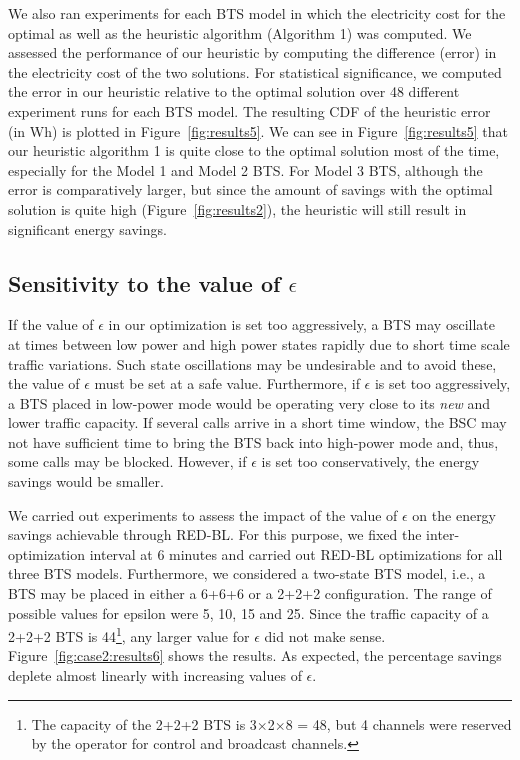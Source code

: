 We also ran experiments for each BTS model in which the electricity cost for the optimal as well as the heuristic algorithm (Algorithm 1) was computed. We assessed the performance of our heuristic by computing the difference (error) in the electricity cost of the two solutions. For statistical significance, we computed the error in our heuristic relative to the optimal solution over 48 different experiment runs for each BTS model. The resulting CDF of the heuristic error (in Wh) is plotted in Figure~\ref{fig:results5}. We can see in Figure~\ref{fig:results5} that our heuristic algorithm 1 is quite close to the optimal solution most of the time, especially for the Model 1 and Model 2 BTS. For Model 3 BTS, although the error is comparatively larger, but since the amount of savings with the optimal solution is quite high (Figure~\ref{fig:results2}), the heuristic will still result in significant energy savings.

\subsection{Sensitivity to the value of $\epsilon$}
\label{subsec:results3}
If the value of $\epsilon$ in our optimization is set too aggressively, a BTS may oscillate at times between low power and high power states rapidly due to short time scale traffic variations. Such state oscillations may be undesirable and to avoid these, the value of $\epsilon$ must be set at a safe value. Furthermore, if $\epsilon$ is set too aggressively, a BTS placed in low-power mode would be operating very close to its \textit{new} and lower traffic capacity. If several calls arrive in a short time window, the BSC may not have sufficient time to bring the BTS back into high-power mode and, thus, some calls may be blocked. However, if $\epsilon$ is set too conservatively, the energy savings would be smaller.

We carried out experiments to assess the impact of the value of $\epsilon$ on the energy savings achievable through RED-BL. For this purpose, we fixed the inter-optimization interval at 6 minutes and carried out RED-BL optimizations for all three BTS models. Furthermore, we considered a two-state BTS model, i.e., a BTS may be placed in either a 6+6+6 or a 2+2+2 configuration. The range of possible values for epsilon were 5, 10, 15 and 25. Since the traffic capacity of a 2+2+2 BTS is 44\footnote{The capacity of the 2+2+2 BTS is 3$\times$2$\times$8 = 48, but 4 channels were reserved by the operator for control and broadcast channels.}, any larger value for $\epsilon$ did not make sense. Figure~\ref{fig:case2:results6} shows the results. As expected, the percentage savings deplete almost linearly with increasing values of $\epsilon$.


